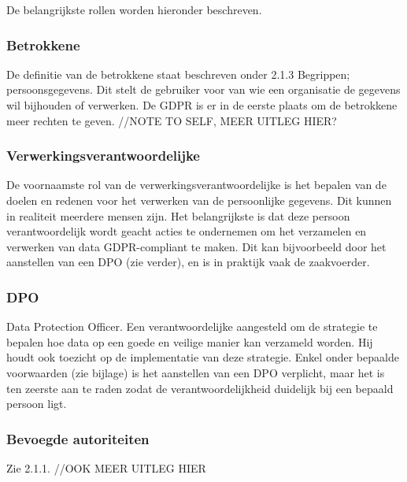 De belangrijkste rollen worden hieronder beschreven. 

\subsubsection{Betrokkene}
De definitie van de betrokkene staat beschreven onder 2.1.3 Begrippen; persoonsgegevens. Dit stelt de gebruiker voor van wie een organisatie de gegevens wil bijhouden of verwerken. De GDPR is er in de eerste plaats om de betrokkene meer rechten te geven. //NOTE TO SELF, MEER UITLEG HIER? 

\subsubsection{Verwerkingsverantwoordelijke}
De voornaamste rol van de verwerkingsverantwoordelijke is het bepalen van de doelen en redenen voor het verwerken van de persoonlijke gegevens. Dit kunnen in realiteit meerdere mensen zijn. Het belangrijkste is dat deze persoon verantwoordelijk wordt geacht acties te ondernemen om het verzamelen en verwerken van data GDPR-compliant te maken. 
Dit kan bijvoorbeeld door het aanstellen van een DPO (zie verder), en is in praktijk vaak de zaakvoerder.  

\subsubsection{DPO}
Data Protection Officer. Een verantwoordelijke aangesteld om de strategie te bepalen hoe data op een goede en veilige manier kan verzameld worden. Hij houdt ook toezicht op de implementatie van deze strategie.
Enkel onder bepaalde voorwaarden (zie bijlage) is het aanstellen van een DPO verplicht, maar het is ten zeerste aan te raden zodat de verantwoordelijkheid duidelijk bij een bepaald persoon ligt. 

\subsubsection{Bevoegde autoriteiten}
Zie 2.1.1. //OOK MEER UITLEG HIER 





